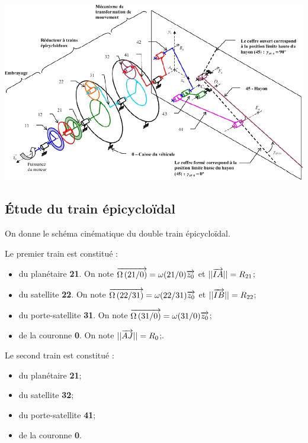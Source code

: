 \documentclass[11pt,oneside]{article}
\begin{document}
\begin{center}
\includegraphics[width=.95\textwidth]{png/A6_schema}
\end{center}

\subsection{Étude du train épicycloïdal}
On donne le schéma cinématique du double train épicycloïdal. 

\vspace{.25cm}

\begin{minipage}[c]{.6\linewidth}
Le premier train est constitué :
\begin{itemize}
\item du planétaire \textbf{21}. On note $\overrightarrow{\Omega\left( {21}/{0}\right)}=\omega(21/0)\overrightarrow{z_0}$ et $||\overrightarrow{IA}|| =R_{21} $;
\item du satellite \textbf{22}. On note $\overrightarrow{\Omega\left( {22}/{31}\right)}=\omega(22/31)\overrightarrow{z_0}$ et $||\overrightarrow{IB}|| =R_{22}$;
\item du porte-satellite \textbf{31}. On note $\overrightarrow{\Omega\left( {31}/{0}\right)}=\omega(31/0)\overrightarrow{z_0}$;
\item de la couronne \textbf{0}. On note  $||\overrightarrow{AJ}|| =R_{0}$;.
\end{itemize}
\end{minipage}\hfill
\begin{minipage}[c]{.37\linewidth}
Le second train est constitué :
\begin{itemize}
\item du planétaire \textbf{21};
\item du satellite \textbf{32};
\item du porte-satellite \textbf{41};
\item de la couronne \textbf{0}.
\end{itemize}
\end{minipage}
\end{document}
